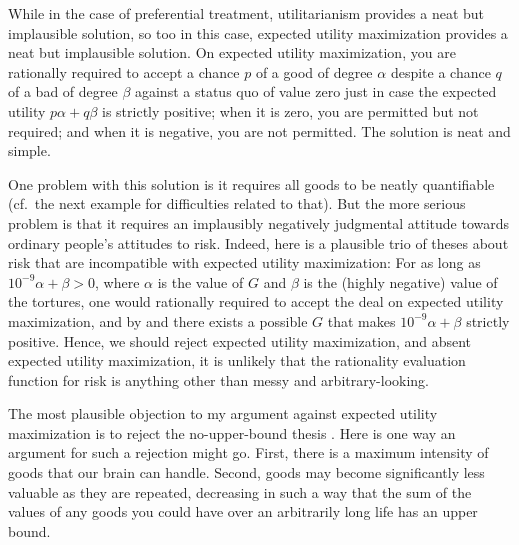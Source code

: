 While in the case of preferential treatment, utilitarianism provides a neat but implausible solution, so too in this case, expected utility
maximization provides a neat but implausible solution. On expected utility maximization, you are rationally required to
accept a chance $p$ of a good of degree $\alpha$ despite a chance $q$ of a bad of degree $\beta$ against a status quo of
value zero just in case the
expected utility $p\alpha + q\beta$ is strictly positive; when it is zero, you are permitted but not required; 
and when it is negative, you are not permitted. The solution is neat and simple. 

One problem with this solution is it requires all goods to be neatly
quantifiable (cf.\ the next example for difficulties related to that). But the more serious problem is that it requires an
implausibly negatively judgmental attitude towards ordinary people's attitudes to risk.
Indeed, here is a plausible trio of theses about risk that are incompatible with expected utility maximization:
For as long as $10^{-9}\alpha + \beta>0$, where $\alpha$ is the value of $G$ and $\beta$ is the (highly negative)
value of the tortures, one would rationally required to accept the deal on expected utility maximization, and by 
and  there exists a possible $G$ that makes $10^{-9}\alpha + \beta$ strictly positive.
Hence, we should reject expected utility maximization, and absent expected utility maximization, it is unlikely that the rationality 
evaluation function for risk is anything other than messy and arbitrary-looking.

The most plausible objection to my argument against expected utility maximization is to reject the no-upper-bound thesis .
Here is one way an argument for such a rejection might go. First, there is a maximum intensity of goods that our brain can handle.
Second, goods may become significantly less valuable as they are repeated, decreasing in such a way that the sum of the values of any 
goods you could have over an arbitrarily long life has an upper bound.

